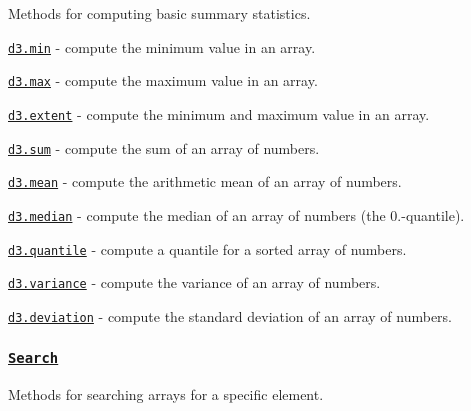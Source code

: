 Methods for computing basic summary statistics.


\begin{DoxyItemize}
\item \href{https://github.com/d3/d3-array/blob/master/README.md#min}{\tt d3.\+min} -\/ compute the minimum value in an array.
\item \href{https://github.com/d3/d3-array/blob/master/README.md#max}{\tt d3.\+max} -\/ compute the maximum value in an array.
\item \href{https://github.com/d3/d3-array/blob/master/README.md#extent}{\tt d3.\+extent} -\/ compute the minimum and maximum value in an array.
\item \href{https://github.com/d3/d3-array/blob/master/README.md#sum}{\tt d3.\+sum} -\/ compute the sum of an array of numbers.
\item \href{https://github.com/d3/d3-array/blob/master/README.md#mean}{\tt d3.\+mean} -\/ compute the arithmetic mean of an array of numbers.
\item \href{https://github.com/d3/d3-array/blob/master/README.md#median}{\tt d3.\+median} -\/ compute the median of an array of numbers (the 0.-\/quantile).
\item \href{https://github.com/d3/d3-array/blob/master/README.md#quantile}{\tt d3.\+quantile} -\/ compute a quantile for a sorted array of numbers.
\item \href{https://github.com/d3/d3-array/blob/master/README.md#variance}{\tt d3.\+variance} -\/ compute the variance of an array of numbers.
\item \href{https://github.com/d3/d3-array/blob/master/README.md#deviation}{\tt d3.\+deviation} -\/ compute the standard deviation of an array of numbers.
\end{DoxyItemize}

\subsubsection*{\href{https://github.com/d3/d3-array/blob/master/README.md#search}{\tt Search}}

Methods for searching arrays for a specific element.



